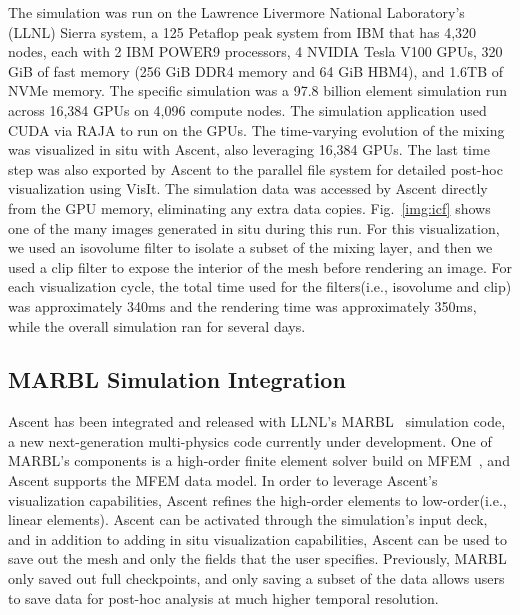 The simulation was run on the Lawrence Livermore National Laboratory's (LLNL)
Sierra system, a 125 Petaflop peak system from IBM that has 4,320 nodes,
each with 2 IBM POWER9 processors, 4 NVIDIA Tesla V100 GPUs, 320 GiB of
fast memory (256 GiB DDR4 memory and 64 GiB HBM4), and 1.6TB of NVMe
memory. The specific simulation was a 97.8 billion element simulation
run across 16,384 GPUs on 4,096 compute nodes. The simulation application
used CUDA via RAJA to run on the GPUs. The time-varying evolution of the
mixing was visualized in situ with Ascent, also leveraging 16,384 GPUs.
The last time step was also exported by Ascent to the parallel file
system for detailed post-hoc visualization using VisIt\cite{VisIt}. The simulation
data was accessed by Ascent directly from the GPU memory, eliminating any
extra data copies.
Fig.~\ref{img:icf} shows one of the many images generated in situ during
this run.
%
For this visualization, we used an isovolume filter to isolate a subset of the
mixing layer, and then we used a clip filter to expose the interior of the mesh
before rendering an image.
%
For each visualization cycle, the total time used for the filters(i.e.,
isovolume and clip) was approximately 340ms and the rendering time was
approximately 350ms, while the overall simulation ran for several days.

\subsection{MARBL Simulation Integration}
Ascent has been integrated and released with LLNL's MARBL~\cite{marbl} simulation code,
a new next-generation multi-physics code currently under development.
%
One of MARBL's components is a high-order finite element solver build on
MFEM~\cite{mfem}, and Ascent supports the MFEM data model.
%
In order to leverage Ascent's visualization capabilities, Ascent refines
the high-order elements to low-order(i.e., linear elements).
%
Ascent can be activated through the simulation's input deck, and in addition
to adding in situ visualization capabilities, Ascent can be used to save out
the mesh and only the fields that the user specifies.
%
Previously, MARBL only saved out full checkpoints, and only saving a subset of the
data allows users to save data for post-hoc analysis at much higher temporal resolution.

